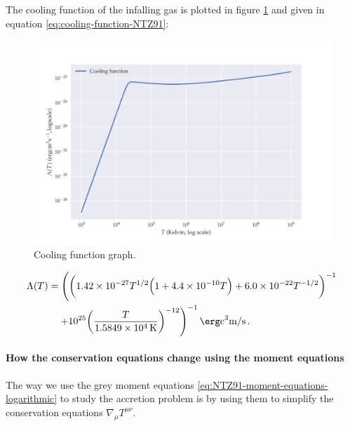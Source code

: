 \documentclass[main.tex]{subfiles}
\begin{document}
The cooling function of the infalling gas is plotted in figure \ref{fig:cooling-function} and given in equation \eqref{eq:cooling-function-NTZ91}:
\begin{figure}
    \centering
    \includegraphics[width=\textwidth]{figures/cooling_function.pdf}
    \caption{Cooling function graph.}
    \label{fig:cooling-function}
\end{figure}
\begin{equation} \label{eq:cooling-function-NTZ91}
    \begin{split}
    \Lambda (T) &= \left(
    \qty(
    \num{1.42e-27}T^{1/2} \qty(
    1 + \num{4.4e-10}T
    ) + \num{6.0e-22}T^{-1/2}
    )^{-1} \right. \\
    & \quad \left. + \num{e25} \qty(\frac{T}{\SI{1.5849e4}{K}})^{-12}
    \right)^{-1} \si{\erg\cubic\centi\metre\per\second} \,.
    \end{split}
\end{equation}


\paragraph{How the conservation equations change using the moment equations}

The way we use the grey moment equations \eqref{eq:NTZ91-moment-equations-logarithmic} to study the accretion problem is by using them to simplify the conservation equations \(\nabla_\mu T^{\mu\nu}\).
\end{document}
